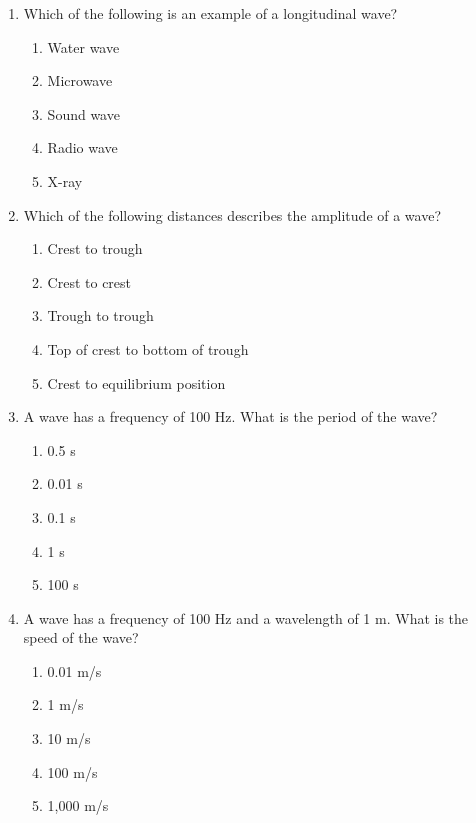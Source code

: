 \documentclass{../../../oss-apphys}
\begin{document}
\genheader


\genmultidirections

\gengravity

\raggedcolumns
\begin{multicols}{2}

  \begin{enumerate}[leftmargin=18pt]

  \item Which of the following is an example of a longitudinal wave?
    \begin{enumerate}[noitemsep,topsep=0pt,leftmargin=18pt,label=(\Alph*)]
    \item Water wave
    \item Microwave
    \item Sound wave
    \item Radio wave
    \item X-ray
    \end{enumerate}
    
  \item Which of the following distances describes the amplitude of a wave?
    \begin{enumerate}[noitemsep,topsep=0pt,leftmargin=18pt,label=(\Alph*)]
    \item Crest to trough
    \item Crest to crest
    \item Trough to trough
    \item Top of crest to bottom of trough
    \item Crest to equilibrium position
    \end{enumerate}
    
  \item A wave has a frequency of 100 Hz. What is the period of the wave?
    \begin{enumerate}[noitemsep,topsep=0pt,leftmargin=18pt,label=(\Alph*)]
    \item 0.5 s
    \item 0.01 s
    \item 0.1 s
    \item 1 s
    \item 100 s
    \end{enumerate}
    
  \item A wave has a frequency of 100 Hz and a wavelength of 1 m. What is
    the speed of the wave?
    \begin{enumerate}[noitemsep,topsep=0pt,leftmargin=18pt,label=(\Alph*)]
    \item  0.01 m/s
    \item  1 m/s
    \item  10 m/s
    \item  100 m/s
    \item  1,000 m/s
    \end{enumerate}


\end{enumerate}
\end{multicols}
\end{document}
